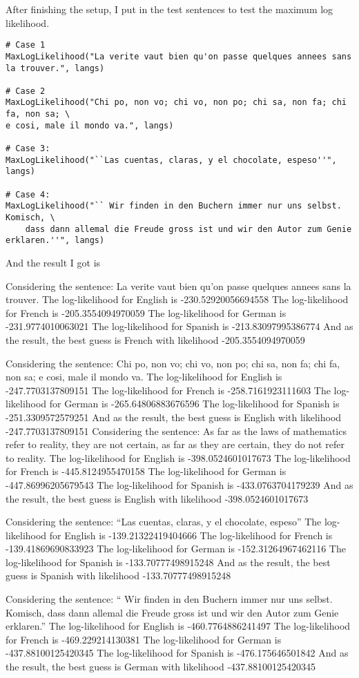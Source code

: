 \documentclass[preprint,12pt]{elsarticle}
\begin{document}
    After finishing the setup, I put in the test sentences to test the maximum log likelihood.
    \begin{lstlisting}
# Case 1
MaxLogLikelihood("La verite vaut bien qu'on passe quelques annees sans la trouver.", langs)

# Case 2
MaxLogLikelihood("Chi po, non vo; chi vo, non po; chi sa, non fa; chi fa, non sa; \
e cosi, male il mondo va.", langs)

# Case 3:
MaxLogLikelihood("``Las cuentas, claras, y el chocolate, espeso''", langs)

# Case 4:
MaxLogLikelihood("`` Wir finden in den Buchern immer nur uns selbst. Komisch, \
    dass dann allemal die Freude gross ist und wir den Autor zum Genie erklaren.''", langs)
    \end{lstlisting}

    And the result I got is

    \begin{spverbatim}
Considering the sentence:  La verite vaut bien qu'on passe quelques annees sans la trouver.
The log-likelihood for  English  is  -230.52920056694558
The log-likelihood for  French  is  -205.3554094970059
The log-likelihood for  German  is  -231.9774010063021
The log-likelihood for  Spanish  is  -213.83097995386774
And as the result, the best guess is  French  with likelihood  
-205.3554094970059 

Considering the sentence:  Chi po, non vo; chi vo, non po; chi sa, non fa; chi fa, non sa; e cosi, male il mondo va.
The log-likelihood for  English  is  -247.7703137809151
The log-likelihood for  French  is  -258.7161923111603
The log-likelihood for  German  is  -265.64806883676596
The log-likelihood for  Spanish  is  -251.3309572579251
And as the result, the best guess is  English  with likelihood  
-247.7703137809151 
Considering the sentence:  As far as the laws of mathematics refer to reality, they are not certain, as far as they are certain, they do not refer to reality.
The log-likelihood for  English  is  -398.0524601017673
The log-likelihood for  French  is  -445.8124955470158
The log-likelihood for  German  is  -447.86996205679543
The log-likelihood for  Spanish  is  -433.0763704179239
And as the result, the best guess is  English  with likelihood  -398.0524601017673 

Considering the sentence:  ``Las cuentas, claras, y el chocolate, espeso''
The log-likelihood for  English  is  -139.21322419404666
The log-likelihood for  French  is  -139.41869690833923
The log-likelihood for  German  is  -152.31264967462116
The log-likelihood for  Spanish  is  -133.70777498915248
And as the result, the best guess is  Spanish  with likelihood  
-133.70777498915248 

Considering the sentence:  `` Wir finden in den Buchern immer nur uns selbst. Komisch,  dass dann allemal die Freude gross ist und wir den Autor zum Genie erklaren.''
The log-likelihood for  English  is  -460.7764886241497
The log-likelihood for  French  is  -469.229214130381
The log-likelihood for  German  is  -437.88100125420345
The log-likelihood for  Spanish  is  -476.175646501842
And as the result, the best guess is  German  with likelihood  
-437.88100125420345 
    \end{spverbatim}
\end{document}
